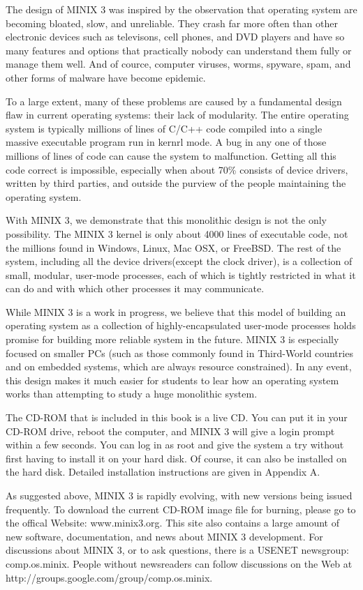 \documentclass{book}
\begin{document}
The design of MINIX 3 was inspired by the observation that operating system are becoming bloated, slow, and unreliable. 
They crash far more often than other electronic devices such as televisons, cell phones, and DVD players 
and have so many features and options that practically nobody can understand them fully or manage them well.
And of cource, computer viruses, worms, spyware, spam, and other forms of malware have become epidemic.

To a large extent, many of these problems are caused by a fundamental design flaw in current operating systems: their lack of modularity. 
The entire operating system is typically millions of lines of C/C++ code compiled into a single massive executable program run in kernrl mode.
A bug in any one of those millions of lines of code can cause the system to malfunction.
Getting all this code correct is impossible, especially when about 70\% consists of device drivers, written by third parties, 
and outside the purview of the people maintaining the operating system.

With MINIX 3, we demonstrate that this monolithic design is not the only possibility. 
The MINIX 3 kernel is only about 4000 lines of executable code, not the millions found in Windows, Linux, Mac OSX, or FreeBSD.
The rest of the system, including all the device drivers(except the clock driver), is a collection of small, modular, user-mode processes, 
each of which is tightly restricted in what it can do and with which other processes it may communicate.

While MINIX 3 is a work in progress, we believe that this model of building an operating system as a collection of highly-encapsulated user-mode 
processes holds promise for building more reliable system in the future.
MINIX 3 is especially focused on smaller PCs
(such as those commonly found in Third-World countries and on embedded systems, which are always resource constrained).
In any event, this design makes it much easier for students to lear how an operating system works than attempting to study a huge monolithic system.

The CD-ROM that is included in this book is a live CD. 
You can put it in your CD-ROM drive, reboot the computer, and MINIX 3 will give a login prompt within a few seconds. 
You can log in as root and give the system a try without first having to install it on your hard disk.
Of course, it can also be installed on the hard disk.
Detailed installation instructions are given in Appendix A.

As suggested above, MINIX 3 is rapidly evolving, with new versions being issued frequently.
To download the current CD-ROM image file for burning, please go to the offical Website: www.minix3.org.
This site also contains a large amount of new software, documentation, and news about MINIX 3 development.
For discussions about MINIX 3, or to ask questions, there is a USENET newsgroup: comp.os.minix.
People without newsreaders can follow discussions on the Web at http://groups.google.com/group/comp.os.minix.
\end{document}
